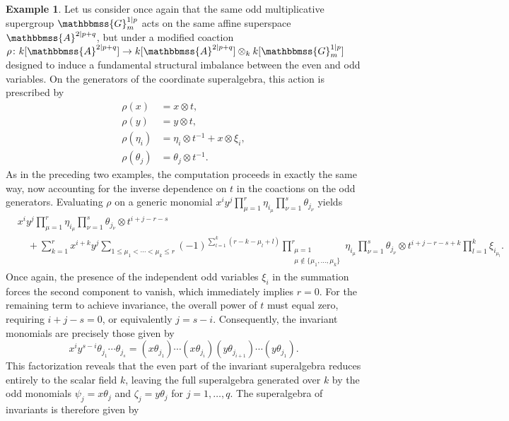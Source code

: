\documentclass[11pt,a4paper,reqno,noamsfonts]{amsart}
\numberwithin{equation}{section}
\theoremstyle{definition}
\newtheorem{example}[theorem]{Example}
\theoremstyle{remark}
\renewcommand{\AA}{\ensuremath{\mathbbmss{A}}}
\newcommand{\GG}{\ensuremath{\mathbbmss{G}}}
\begin{document}
\begin{example}\label{ex:3.12}
Let us consider once again that the same odd multiplicative supergroup $\GG_{m}^{1 \vert p}$ acts on the same affine superspace $\AA^{2 \vert p+q}$, but under a modified coaction $\rho \colon k[\AA^{2 \vert p+q}] \to k[\AA^{2 \vert p+q}] \otimes_k k[\GG_{m}^{1 \vert p}]$ designed to induce a fundamental structural imbalance between the even and odd variables. On the generators of the coordinate superalgebra, this action is prescribed by
$$
\begin{aligned}
\rho(x) &= x \otimes t, \\
\rho(y) &= y \otimes t, \\
\rho(\eta_i) & = \eta_i \otimes t^{-1} + x \otimes \xi_i, \\
\rho(\theta_j) &= \theta_j \otimes t^{-1}.
\end{aligned}
$$
As in the preceding two examples, the computation proceeds in exactly the same way, now accounting for the inverse dependence on $t$ in the coactions on the odd generators. Evaluating $\rho$ on a generic monomial $x^{i} y^{j} \prod_{\mu=1}^{r} \eta_{i_{\mu}} \prod_{\nu=1}^{s} \theta_{j_{\nu}}$ yields
$$
\begin{aligned}
&x^{i} y^{j}  \prod_{\mu=1}^{r} \eta_{i_{\mu}} \prod_{\nu=1}^{s}\theta_{j_{\nu}}  \otimes t^{i + j - r - s} \\
 &\quad + \sum_{k = 1}^{r} x^{i + k} y^{j} \sum_{1 \leq \mu_1 < \cdots < \mu_k \leq r}(-1)^{\sum_{l=1}^{k} (r - k - \mu_l  +l)} \prod_{\substack{\mu=1 \\ \mu \not\in \{ \mu_1,\dots,\mu_k \}}}^{r} \eta_{i_{\mu}}   \prod_{\nu=1}^{s}\theta_{j_{\nu}}    \otimes t^{i + j - r - s + k} \prod_{l=1}^{k}  \xi_{i_{\mu_{l}}}.
\end{aligned}
$$
Once again, the presence of the independent odd variables $\xi_{i}$ in the summation forces the second component to vanish, which immediately implies $r = 0$. For the remaining term to achieve invariance, the overall power of $t$ must equal zero, requiring $i + j - s = 0$, or equivalently $j = s - i$. Consequently, the invariant monomials are precisely those given by
$$
x^{i} y^{s - i}  \theta_{j_1} \cdots \theta_{j_s} = (x \theta_{j_1}) \cdots (x \theta_{j_i}) (y \theta_{j_{i+1}}) \cdots (y \theta_{j_1}). 
$$
This factorization reveals that the even part of the invariant superalgebra reduces entirely to the scalar field $k$, leaving the full superalgebra generated over $k$ by the odd monomials $\psi_j = x \theta_j$ and $\zeta_j = y \theta_j$ for $j = 1, \dots, q$. The superalgebra of invariants is therefore given by

\end{example}
\end{document}
